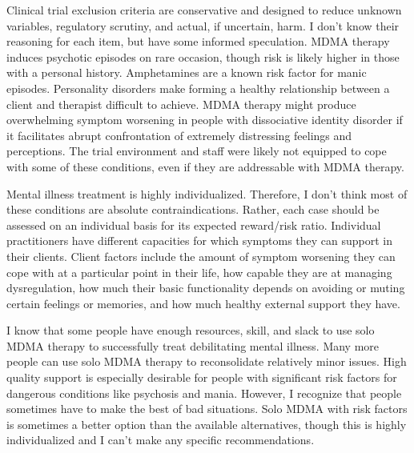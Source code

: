 \documentclass[11pt,oneside]{book}
\begin{document}
Clinical trial exclusion criteria are conservative and designed to reduce unknown variables, regulatory scrutiny, and actual, if uncertain, harm. I don't know their reasoning for each item, but have some informed speculation. MDMA therapy induces psychotic episodes on rare occasion, though risk is likely higher in those with a personal history. Amphetamines are a known risk factor for manic episodes. Personality disorders make forming a healthy relationship between a client and therapist difficult to achieve. MDMA therapy might produce overwhelming symptom worsening in people with dissociative identity disorder if it facilitates abrupt confrontation of extremely distressing feelings and perceptions. The trial environment and staff were likely not equipped to cope with some of these conditions, even if they are addressable with MDMA therapy.

Mental illness treatment is highly individualized. Therefore, I don't think most of these conditions are absolute contraindications. Rather, each case should be assessed on an individual basis for its expected reward/risk ratio. Individual practitioners have different capacities for which symptoms they can support in their clients. Client factors include the amount of symptom worsening they can cope with at a particular point in their life, how capable they are at managing dysregulation, how much their basic functionality depends on avoiding or muting certain feelings or memories, and how much healthy external support they have.

I know that some people have enough resources, skill, and slack to use solo MDMA therapy to successfully treat debilitating mental illness. Many more people can use solo MDMA therapy to reconsolidate relatively minor issues. High quality support is especially desirable for people with significant risk factors for dangerous conditions like psychosis and mania. However, I recognize that people sometimes have to make the best of bad situations. Solo MDMA with risk factors is sometimes a better option than the available alternatives, though this is highly individualized and I can't make any specific recommendations.
\end{document}

